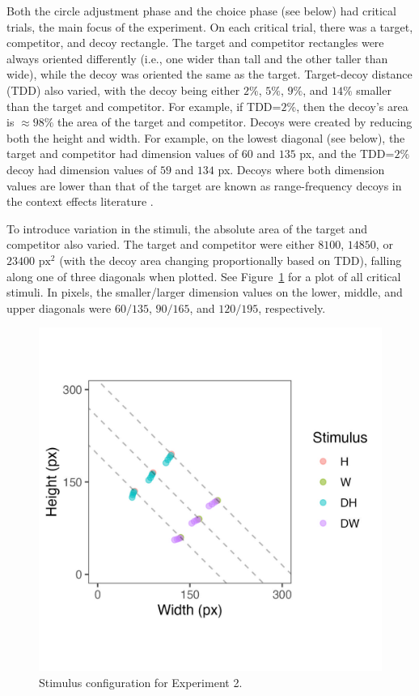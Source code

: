 Both the circle adjustment phase and the choice phase (see below) had critical trials, the main focus of the experiment. On each critical trial, there was a target, competitor, and decoy rectangle. The target and competitor rectangles were always oriented differently (i.e., one wider than tall and the other taller than wide), while the decoy was oriented the same as the target. Target-decoy distance (TDD) also varied, with the decoy being either $2\%$, $5\%$, $9\%$, and $14\%$ smaller than the target and competitor. For example, if TDD=$2\%$, then the decoy's area is $\approx98\%$ the area of the target and competitor. Decoys were created by reducing both the height and width. For example, on the lowest diagonal (see below), the target and competitor had dimension values of $60$ and $135$ px, and the TDD=$2\%$ decoy had dimension values of $59$ and $134$ px. Decoys where both dimension values are lower than that of the target are known as range-frequency decoys in the context effects literature \parencite{wedellDistinguishingModelsContextuallya}. 

To introduce variation in the stimuli, the absolute area of the target and competitor also varied. The target and competitor were either $8100$, $14850$, or $23400$ $\text{px}^2$ (with the decoy area changing proportionally based on TDD), falling along one of three diagonals when plotted. See Figure~\ref{fig:e2_stim} for a plot of all critical stimuli. In pixels, the smaller/larger dimension values on the lower, middle, and upper diagonals were $60/135$, $90/165$, and $120/195$, respectively.
 
\begin{figure}
   \includegraphics[width=\linewidth]{figures/circle_exp_stim_plot.jpeg}
   \caption{Stimulus configuration for Experiment 2.}
   \label{fig:e2_stim}
\end{figure}

